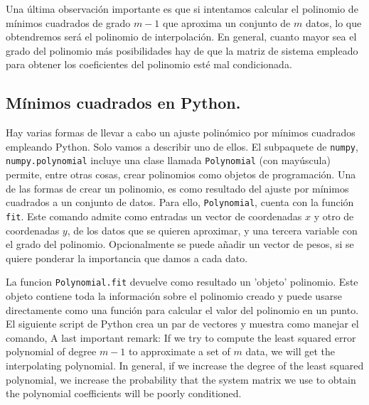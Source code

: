 \begin{paracol}{2}
Una última observación importante es que si intentamos calcular el polinomio de mínimos cuadrados de grado $m-1$ que aproxima un conjunto de $m$ datos, lo que obtendremos será el polinomio de interpolación. En general, cuanto mayor sea el grado del polinomio más posibilidades hay de que la matriz de sistema empleado para obtener los coeficientes del polinomio esté mal condicionada.

\subsection{Mínimos cuadrados en Py\-thon.}

Hay varias formas de llevar a cabo un ajuste polinómico por mínimos cuadrados empleando Python. Solo vamos a describir uno de ellos. El subpaquete de \texttt{numpy}, \texttt{numpy.polynomial} incluye una clase llamada \texttt{Polynomial} (con mayúscula) permite, entre otras cosas, crear polinomios como objetos de programación. Una de las formas de crear un polinomio, es como resultado del ajuste por mínimos cuadrados a un conjunto de datos. Para ello, \texttt{Polynomial}, cuenta con la función \texttt{fit}. Este comando admite como entradas un vector de coordenadas $x$ y otro de coordenadas $y$, de los datos que se quieren aproximar, y una tercera variable con el grado del polinomio. Opcionalmente se puede añadir un vector de pesos, si se quiere ponderar la importancia que damos a cada dato. 

La funcion \texttt{Polynomial.fit} devuelve como resultado un 'objeto' polinomio. Este objeto contiene toda la información sobre el polinomio creado y puede usarse directamente como una función para calcular el valor del polinomio en un punto. El siguiente script de Python crea un par de vectores y muestra como manejar el comando,
\switchcolumn
A last important remark: If we try to compute the least squared error polynomial of degree $m-1$ to approximate a set of $m$ data, we will get the interpolating polynomial. In general, if we increase the degree of the least squared polynomial, we increase the probability that the system matrix we use to obtain the polynomial coefficients will be poorly conditioned.


\end{paracol}
